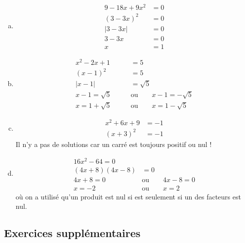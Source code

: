 \documentclass[a4paper, 14pt]{extarticle}
\theoremstyle{plain}
\theoremstyle{definition}
\begin{document}
{\begin{enumerate}[a)]
			\item
			\begin{align*}
				9 - 18x + 9x^2 &= 0 \\
				(3-3x)^2 &= 0 \\
				|3-3x| &= 0 \\
				3-3x &= 0 \\
				x&=1
			\end{align*}
			\item 
			\begin{align*}
				x^2 - 2x + 1 &= 5 \\
				(x-1)^2 &= 5 \\
				|x-1| &= \sqrt{5} \\
				x-1=\sqrt{5} \qquad & \text{ou} \qquad x-1=-\sqrt{5} \\
				x=1+\sqrt{5} \qquad & \text{ou} \qquad x=1-\sqrt{5}
			\end{align*}
			\item 
			\begin{align*}
				x^2 +6x + 9 &= -1 \\
				(x+3)^2 &= -1 
			\end{align*}
			Il n'y a pas de solutions car un carré est toujours positif ou nul !
			\item 
			\begin{align*}
				16x^2 - 64 = 0 \\
				(4x+8)(4x-8) &= 0 \\
				4x+8=0 \qquad & \text{ou} \qquad 4x-8=0 \\
				x=-2 \qquad & \text{ou} \qquad x=2
			\end{align*}
			où on a utilisé qu'un produit est nul si est seulement si un des facteurs est nul.
		\end{enumerate}
	
	
	}
	
	\ifdys
	\else
	\newpage
	\fi 
	
	\subsection*{Exercices supplémentaires}
	
\end{document}
